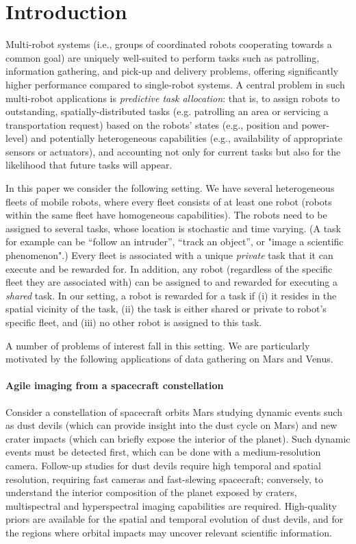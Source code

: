 \documentclass[conference]{IEEEtran}
\begin{document}
\section{Introduction}\label{sec:introduction}
Multi-robot systems (i.e., groups of coordinated robots cooperating towards a common goal) are uniquely well-suited to perform tasks such as patrolling, information gathering, and pick-up and delivery problems, offering significantly higher performance compared to single-robot systems. A central problem in such multi-robot applications is \emph{predictive task allocation}: that is, to assign robots to outstanding, spatially-distributed tasks (e.g. patrolling an area or servicing a transportation request) based on the robots' states (e.g., position and power-level) and potentially heterogeneous capabilities (e.g., availability of appropriate sensors or actuators), and accounting not only for current tasks but also for the likelihood that future tasks will appear.

In this paper we consider the following setting. We have several heterogeneous fleets of mobile robots, where every fleet consists of at least one robot (robots within the same fleet have homogeneous capabilities). The robots need to be assigned to several tasks, whose location is stochastic and time varying. (A task for example can be ``follow an intruder'', ``track an object'', or "image a scientific phenomenon".) Every fleet is associated with a unique \emph{private} task that it can execute and be rewarded for. In addition, any robot (regardless of the specific fleet they are associated with) can be assigned to and rewarded for executing a \emph{shared} task. In our setting, a robot is rewarded for a task if (i) it resides in the spatial vicinity of the task, (ii) the task is either shared or private to robot's specific fleet, and (iii) no other robot is assigned to this task. 

A number of problems of interest fall in this setting. We are particularly motivated by the following applications of data gathering on Mars and Venus.
\paragraph{Agile imaging from a spacecraft constellation} Consider a constellation of spacecraft orbits Mars studying dynamic events such as dust devils  (which can provide insight into the dust cycle on Mars) and new crater impacts (which can briefly expose the interior of the planet). Such dynamic events must be detected first, which can be done with a medium-resolution camera. Follow-up studies for dust devils require high temporal and spatial resolution, requiring fast cameras and fast-slewing spacecraft; conversely, to understand the interior composition of the planet exposed by craters, multispectral and hyperspectral imaging capabilities are required. High-quality priors are available for the spatial and temporal evolution of dust devils, and for the regions where orbital impacts may uncover relevant scientific information.
\end{document}

